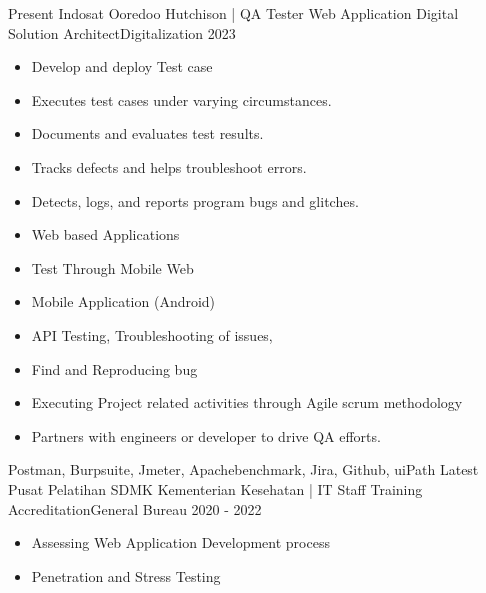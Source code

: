 %
%
%
\begin{experiences}
  \experience
    {Present}   {Indosat Ooredoo Hutchison | QA Tester Web Application }{Digital Solution Architect}{Digitalization}
    {2023} {
                      \begin{itemize}
                        \item Develop and deploy Test case               
                        \item Executes test cases under varying circumstances.          
                        \item Documents and evaluates test results.        
                        \item Tracks defects and helps troubleshoot errors.
                        \item Detects, logs, and reports program bugs and glitches.
                        \item Web based Applications 
                        \item Test Through Mobile Web
                        \item Mobile Application (Android)
                        \item API Testing, Troubleshooting of issues, 
                        \item Find and Reproducing bug 
                        \item Executing Project related activities through Agile scrum methodology 
                        \item Partners with engineers or developer to drive QA efforts.                        
                      \end{itemize}
                    }
                    {Postman, Burpsuite, Jmeter, Apachebenchmark, Jira, Github, uiPath}
  \emptySeparator
  \experience
    {Latest}   {Pusat Pelatihan SDMK Kementerian Kesehatan | IT Staff }{Training Accreditation}{General Bureau}
    {2020 - 2022} {
                      \begin{itemize}
                        \item Assessing Web Application Development process                       
                        \item Penetration and Stress Testing                    

\end{itemize}}
\end{experiences}
